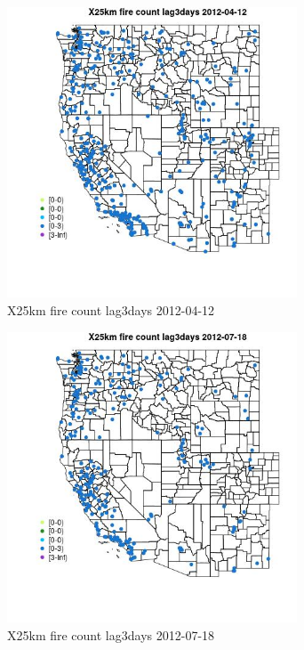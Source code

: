 \begin{figure} 
\centering  
\includegraphics[width=0.77\textwidth]{Code_Outputs/Report_ML_input_PM25_Step4_part_e_de_duplicated_aves_compiled_2019-05-14wNAs_MapObsX25km_fire_count_lag3days2012-04-12.jpg} 
\caption{\label{fig:Report_ML_input_PM25_Step4_part_e_de_duplicated_aves_compiled_2019-05-14wNAsMapObsX25km_fire_count_lag3days2012-04-12}X25km fire count lag3days 2012-04-12} 
\end{figure} 
 

\clearpage 

\begin{figure} 
\centering  
\includegraphics[width=0.77\textwidth]{Code_Outputs/Report_ML_input_PM25_Step4_part_e_de_duplicated_aves_compiled_2019-05-14wNAs_MapObsX25km_fire_count_lag3days2012-07-18.jpg} 
\caption{\label{fig:Report_ML_input_PM25_Step4_part_e_de_duplicated_aves_compiled_2019-05-14wNAsMapObsX25km_fire_count_lag3days2012-07-18}X25km fire count lag3days 2012-07-18} 
\end{figure} 
 

